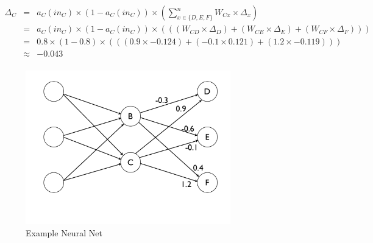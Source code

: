 \documentclass[--SOLUTION-OPTION--]{ditpaper}
\begin{document}
\begin{enumerate}
\begin{enumerate}
\begin{answer}
\begin{eqnarray*}
\Delta_C &=& a_C(in_C) \times (1-a_C(in_C)) \times \left( \sum_{x \in \{D,E,F\}}^{n}W_{Cx} \times \Delta_x \right)\\
&=& a_C(in_C) \times (1-a_C(in_C)) \times \left(((W_{CD} \times \Delta_D)+(W_{CE} \times \Delta_E)+(W_{CF} \times \Delta_F))\right)\\
&=& 0.8 \times (1-0.8) \times \left(((0.9 \times -0.124)+(-0.1 \times 0.121)+(1.2 \times -0.119))\right)\\
&\approx& -0.043\\
\end{eqnarray*}

		\end{answer}
\end{enumerate}

\end{enumerate}

\clearpage
\newpage

\begin{figure}[htbp]
\begin{center}
\includegraphics[width=3.5in]{./images/backpropnetwork1.png}
\caption{Example Neural Net}
\label{fig:nn}
\end{center}
\end{figure}
\end{document}

